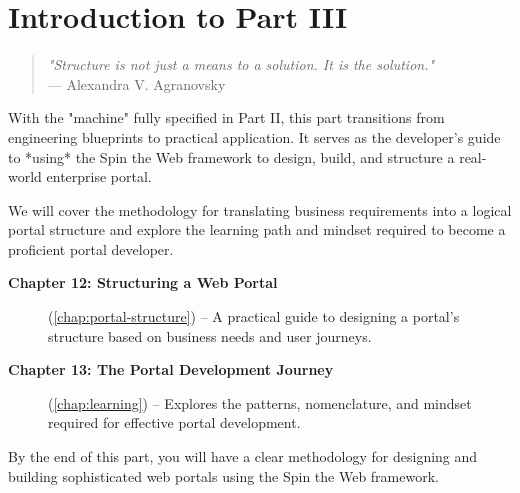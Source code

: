 
\chapter*{Introduction to Part III}
\label{part:implementation}

\begin{quote}
\textit{"Structure is not just a means to a solution. It is the solution."} \\
— Alexandra V. Agranovsky
\end{quote}

With the "machine" fully specified in Part II, this part transitions from engineering blueprints to practical application. It serves as the developer's guide to *using* the Spin the Web framework to design, build, and structure a real-world enterprise portal.

We will cover the methodology for translating business requirements into a logical portal structure and explore the learning path and mindset required to become a proficient portal developer.
\begin{description}
\item[\textbf{Chapter 12: Structuring a Web Portal}] (\cref{chap:portal-structure}) -- A practical guide to designing a portal's structure based on business needs and user journeys.

\item[\textbf{Chapter 13: The Portal Development Journey}] (\cref{chap:learning}) -- Explores the patterns, nomenclature, and mindset required for effective portal development.
\end{description}

By the end of this part, you will have a clear methodology for designing and building sophisticated web portals using the Spin the Web framework.
